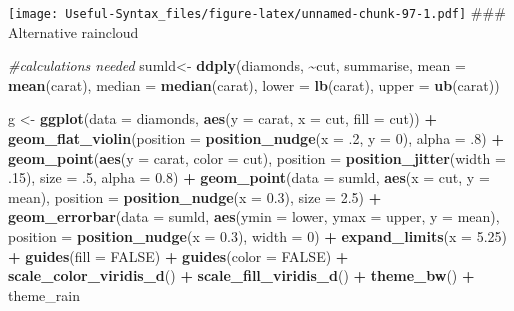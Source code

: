 \documentclass[
]{article}
\newenvironment{Shaded}{\begin{snugshade}}{\end{snugshade}}
\newcommand{\AttributeTok}[1]{\textcolor[rgb]{0.13,0.29,0.53}{#1}}
\newcommand{\CommentTok}[1]{\textcolor[rgb]{0.56,0.35,0.01}{\textit{#1}}}
\newcommand{\ConstantTok}[1]{\textcolor[rgb]{0.56,0.35,0.01}{#1}}
\newcommand{\DecValTok}[1]{\textcolor[rgb]{0.00,0.00,0.81}{#1}}
\newcommand{\FloatTok}[1]{\textcolor[rgb]{0.00,0.00,0.81}{#1}}
\newcommand{\FunctionTok}[1]{\textcolor[rgb]{0.13,0.29,0.53}{\textbf{#1}}}
\newcommand{\NormalTok}[1]{#1}
\newcommand{\OtherTok}[1]{\textcolor[rgb]{0.56,0.35,0.01}{#1}}
\newcommand{\SpecialCharTok}[1]{\textcolor[rgb]{0.81,0.36,0.00}{\textbf{#1}}}
\begin{document}
\texttt{[image: Useful-Syntax\_files/figure-latex/unnamed-chunk-97-1.pdf]}
\#\#\# Alternative raincloud

\begin{Shaded}
\begin{Highlighting}[]
\CommentTok{\#calculations needed}
\NormalTok{sumld}\OtherTok{\textless{}{-}} \FunctionTok{ddply}\NormalTok{(diamonds, }\SpecialCharTok{\textasciitilde{}}\NormalTok{cut, summarise, }\AttributeTok{mean =} \FunctionTok{mean}\NormalTok{(carat), }\AttributeTok{median =} \FunctionTok{median}\NormalTok{(carat), }\AttributeTok{lower =} \FunctionTok{lb}\NormalTok{(carat), }\AttributeTok{upper =} \FunctionTok{ub}\NormalTok{(carat))}

\NormalTok{g }\OtherTok{\textless{}{-}} \FunctionTok{ggplot}\NormalTok{(}\AttributeTok{data =}\NormalTok{ diamonds, }\FunctionTok{aes}\NormalTok{(}\AttributeTok{y =}\NormalTok{ carat, }\AttributeTok{x =}\NormalTok{ cut, }\AttributeTok{fill =}\NormalTok{ cut)) }\SpecialCharTok{+}
\FunctionTok{geom\_flat\_violin}\NormalTok{(}\AttributeTok{position =} \FunctionTok{position\_nudge}\NormalTok{(}\AttributeTok{x =}\NormalTok{ .}\DecValTok{2}\NormalTok{, }\AttributeTok{y =} \DecValTok{0}\NormalTok{), }\AttributeTok{alpha =}\NormalTok{ .}\DecValTok{8}\NormalTok{) }\SpecialCharTok{+}
\FunctionTok{geom\_point}\NormalTok{(}\FunctionTok{aes}\NormalTok{(}\AttributeTok{y =}\NormalTok{ carat, }\AttributeTok{color =}\NormalTok{ cut), }\AttributeTok{position =} \FunctionTok{position\_jitter}\NormalTok{(}\AttributeTok{width =}\NormalTok{ .}\DecValTok{15}\NormalTok{), }\AttributeTok{size =}\NormalTok{ .}\DecValTok{5}\NormalTok{, }\AttributeTok{alpha =} \FloatTok{0.8}\NormalTok{) }\SpecialCharTok{+}
\FunctionTok{geom\_point}\NormalTok{(}\AttributeTok{data =}\NormalTok{ sumld, }\FunctionTok{aes}\NormalTok{(}\AttributeTok{x =}\NormalTok{ cut, }\AttributeTok{y =}\NormalTok{ mean), }\AttributeTok{position =} \FunctionTok{position\_nudge}\NormalTok{(}\AttributeTok{x =} \FloatTok{0.3}\NormalTok{), }\AttributeTok{size =} \FloatTok{2.5}\NormalTok{) }\SpecialCharTok{+}
\FunctionTok{geom\_errorbar}\NormalTok{(}\AttributeTok{data =}\NormalTok{ sumld, }\FunctionTok{aes}\NormalTok{(}\AttributeTok{ymin =}\NormalTok{ lower, }\AttributeTok{ymax =}\NormalTok{ upper, }\AttributeTok{y =}\NormalTok{ mean), }\AttributeTok{position =} \FunctionTok{position\_nudge}\NormalTok{(}\AttributeTok{x =} \FloatTok{0.3}\NormalTok{), }\AttributeTok{width =} \DecValTok{0}\NormalTok{) }\SpecialCharTok{+}
\FunctionTok{expand\_limits}\NormalTok{(}\AttributeTok{x =} \FloatTok{5.25}\NormalTok{) }\SpecialCharTok{+}
\FunctionTok{guides}\NormalTok{(}\AttributeTok{fill =} \ConstantTok{FALSE}\NormalTok{) }\SpecialCharTok{+}
\FunctionTok{guides}\NormalTok{(}\AttributeTok{color =} \ConstantTok{FALSE}\NormalTok{) }\SpecialCharTok{+}
\FunctionTok{scale\_color\_viridis\_d}\NormalTok{() }\SpecialCharTok{+}
\FunctionTok{scale\_fill\_viridis\_d}\NormalTok{() }\SpecialCharTok{+}
\FunctionTok{theme\_bw}\NormalTok{() }\SpecialCharTok{+}
\NormalTok{theme\_rain}
\end{Highlighting}
\end{Shaded}
\end{document}
